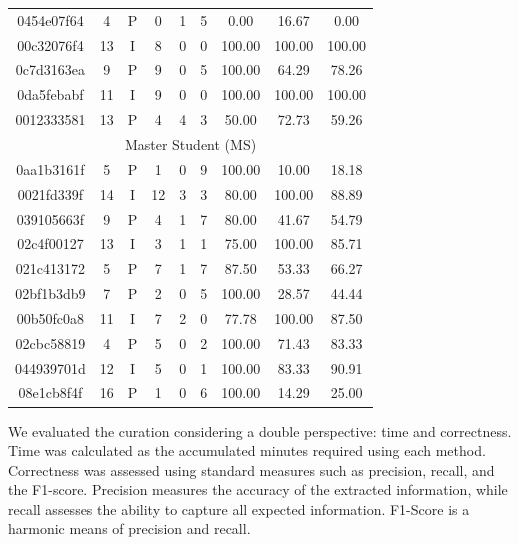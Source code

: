 \begin{table}[htpb]
\begin{tabular}{cc|c|ccc|ccc}
0454e07f64  & 4     & P     & 0     & 1     &   5   & 0.00      & 16.67     & 0.00 \\
00c32076f4  & 13    & I     & 8     & 0     &   0   & 100.00    & 100.00    & 100.00 \\
0c7d3163ea  & 9     & P     & 9     & 0     &   5   & 100.00    & 64.29     & 78.26 \\
0da5febabf  & 11    & I     & 9     & 0     &   0   & 100.00    & 100.00    & 100.00 \\
0012333581  & 13    & P     & 4     & 4     &   3   & 50.00     & 72.73     & 59.26 \\
\midrule
\multicolumn{9}{c}{Master Student (MS)}\\
\midrule
0aa1b3161f  & 5     & P     & 1     & 0     &   9   & 100.00    & 10.00     & 18.18 \\
0021fd339f  & 14    & I     & 12    & 3     &   3   & 80.00     & 100.00    & 88.89 \\
039105663f  & 9     & P     & 4     & 1     &   7   & 80.00     & 41.67     & 54.79 \\
02c4f00127  & 13    & I     & 3     & 1     &   1   & 75.00     & 100.00    & 85.71 \\
021c413172  & 5     & P     & 7     & 1     &   7   & 87.50     & 53.33     & 66.27 \\
02bf1b3db9  & 7     & P     & 2     & 0     &   5   & 100.00    & 28.57     & 44.44 \\
00b50fc0a8  & 11    & I     & 7     & 2     &   0   & 77.78     & 100.00    & 87.50 \\
02cbc58819  & 4     & P     & 5     & 0     &   2   & 100.00    & 71.43     & 83.33 \\
044939701d  & 12    & I     & 5     & 0     &   1   & 100.00    & 83.33     & 90.91 \\
08e1cb8f4f  & 16    & P     & 1     & 0     &   6   & 100.00    & 14.29     & 25.00 \\
\bottomrule
\end{tabular}
\end{table}

We evaluated the curation considering a double perspective: time and correctness. 
Time was calculated as the accumulated minutes required using each method. 
Correctness was assessed using standard measures such as precision, recall, and the F1-score.
Precision measures the accuracy of the extracted information, while recall assesses the ability to capture all expected information. F1-Score is a harmonic means of precision and recall. 

